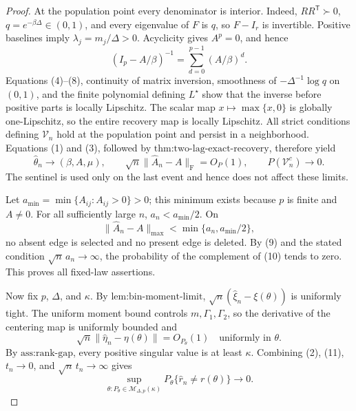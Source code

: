\documentclass{article}
\begin{document}
\begin{proof}
At the population point every denominator is interior.  Indeed, \(RR^{\mathsf T}\succ0\), \(q=e^{-\beta\Delta}\in(0,1)\), and every eigenvalue of \(F\) is \(q\), so \(F-I_r\) is invertible.  Positive baselines imply \(\lambda_j=m_j/\Delta>0\).  Acyclicity gives \(A^p=0\), and hence
\[
 (I_p-A/\beta)^{-1}=\sum_{d=0}^{p-1}(A/\beta)^d.
\tag{8}
\]
Equations (4)--(8), continuity of matrix inversion, smoothness of \(-\Delta^{-1}\log q\) on \((0,1)\), and the finite polynomial defining \(L^\star\) show that the inverse before positive parts is locally Lipschitz.  The scalar map \(x\mapsto\max\{x,0\}\) is globally one-Lipschitz, so the entire recovery map is locally Lipschitz.  All strict conditions defining \(\mathcal V_n\) hold at the population point and persist in a neighborhood.  Equations (1) and (3), followed by \(\text{thm:two-lag-exact-recovery}\), therefore yield
\[
 \widehat\theta_n\longrightarrow(\beta,A,\mu),
 \qquad
 \sqrt n\lVert\widehat A_n-A\rVert_{\mathrm F}=O_P(1),
 \qquad
 P(\mathcal V_n^c)\longrightarrow0.
\tag{9}
\]
The sentinel is used only on the last event and hence does not affect these limits.

Let \(a_{\min}=\min\{A_{ij}:A_{ij}>0\}>0\); this minimum exists because \(p\) is finite and \(A\neq0\).  For all sufficiently large \(n\), \(a_n<a_{\min}/2\).  On
\[
 \lVert\widehat A_n-A\rVert_{\max}<\min\{a_n,a_{\min}/2\},
\tag{10}
\]
no absent edge is selected and no present edge is deleted.  By (9) and the stated condition \(\sqrt n\,a_n\to\infty\), the probability of the complement of (10) tends to zero.  This proves all fixed-law assertions.

Now fix \(p\), \(\Delta\), and \(\kappa\).  By \(\text{lem:bin-moment-limit}\), \(\sqrt n(\widehat\xi_n-\xi(\theta))\) is uniformly tight.  The uniform moment bound controls \(m,\Gamma_1,\Gamma_2\), so the derivative of the centering map is uniformly bounded and
\[
 \sqrt n\lVert\widehat\eta_n-\eta(\theta)\rVert=O_{P_\theta}(1)
 \quad\text{uniformly in }\theta.
\tag{11}
\]
By \(\text{ass:rank-gap}\), every positive singular value is at least \(\kappa\).  Combining (2), (11), \(t_n\to0\), and \(\sqrt n\,t_n\to\infty\) gives
\[
 \sup_{\theta:P_\theta\in\mathcal M_{\Delta,p}(\kappa)}
 P_\theta\{\widehat r_n\neq r(\theta)\}\longrightarrow0.
\tag{12}
\]


\end{proof}
\end{document}
